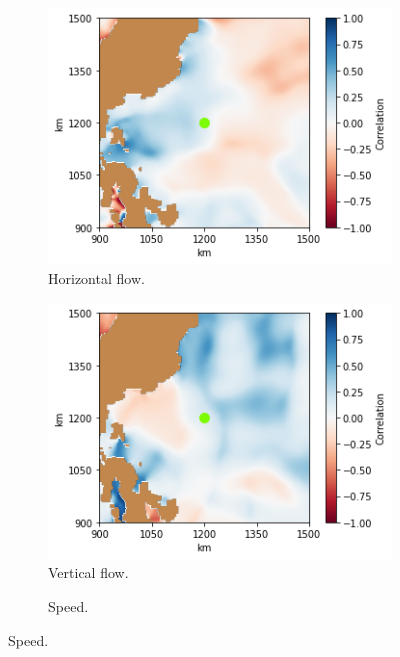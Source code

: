 \documentclass[11pt, english]{article}
\begin{document}
\begin{multicols}{2}
\begin{figure}
	\begin{subfigure}{0.33\textwidth}
		\centering
		\caption{Horizontal flow.}
		\label{fig:coord-2-h}
		\includegraphics[width=\textwidth]{coord-2-h}
	\end{subfigure}\hfill
	\begin{subfigure}{0.33\textwidth}
		\centering
		\caption{Vertical flow.}
		\label{fig:coord-2-v}
		\includegraphics[width=\textwidth]{coord-2-v}
	\end{subfigure}
	\begin{subfigure}{0.33\textwidth}
		\centering
		\caption{Speed.}
		\label{fig:coord-2-s}

\end{subfigure}
\end{figure}
\end{multicols}
\end{document}

